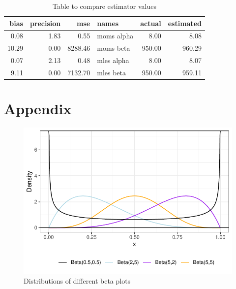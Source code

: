\documentclass{article}\usepackage[]{graphicx}\usepackage[]{xcolor}
\makeatletter
\def\maxwidth{ %
  \ifdim\Gin@nat@width>\linewidth
    \linewidth
  \else
    \Gin@nat@width
  \fi
}
\newenvironment{knitrout}{}{} %
\makeatother
\begin{document}
\begin{multicols}{2}
\begin{table}[H]
\centering
\begingroup\small
\begin{tabular}{rrrlrr}
  \hline
bias & precision & mse & names & actual & estimated \\ 
  \hline
0.08 & 1.83 & 0.55 & moms alpha & 8.00 & 8.08 \\ 
  10.29 & 0.00 & 8288.46 & moms beta & 950.00 & 960.29 \\ 
  0.07 & 2.13 & 0.48 & mles alpha & 8.00 & 8.07 \\ 
  9.11 & 0.00 & 7132.70 & mles beta & 950.00 & 959.11 \\ 
   \hline
\end{tabular}
\endgroup
\caption{Table to compare estimator values} 
\label{table2}
\end{table}


\vspace{2em}


\begin{tiny}

\end{tiny}


\newpage
\section{Appendix}


\begin{figure}[H]
\begin{center}
\begin{knitrout}
\color{fgcolor}
\includegraphics[width=\maxwidth]{figure/unnamed-chunk-5-1} 
\end{knitrout}
\caption{Distributions of different beta plots}
\label{plot1} 
\end{center}
\end{figure}



\end{multicols}
\end{document}
